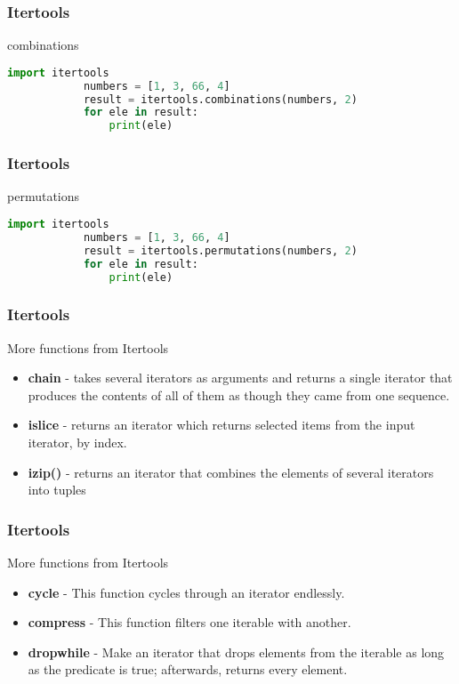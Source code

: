\documentclass[14pt]{beamer}
\begin{document}
    \begin{frame}[containsverbatim]
        \frametitle{Itertools}
        \alert{combinations}
        \begin{lstlisting}[language=Python]
            import itertools
            numbers = [1, 3, 66, 4]
            result = itertools.combinations(numbers, 2)
            for ele in result:
                print(ele)
        \end{lstlisting}
    \end{frame}
    \begin{frame}[containsverbatim]
        \frametitle{Itertools}
        \alert{permutations}
        \begin{lstlisting}[language=Python]
            import itertools
            numbers = [1, 3, 66, 4]
            result = itertools.permutations(numbers, 2)
            for ele in result:
                print(ele)
        \end{lstlisting}
    \end{frame}
    \begin{frame}
        \frametitle{Itertools}
        \alert{More functions from Itertools}
        \begin{itemize}
            \item \textbf{chain} - takes several iterators as arguments and returns a single iterator that produces the contents of all of them as though they came from one sequence.
            \item \textbf{islice} - returns an iterator which returns selected items from the input iterator, by index. 
            \item \textbf{izip()} - returns an iterator that combines the elements of several iterators into tuples
        \end{itemize}
    \end{frame}
    \begin{frame}
        \frametitle{Itertools}
        \alert{More functions from Itertools}
        \begin{itemize}
            \item \textbf{cycle} - This function cycles through an iterator endlessly.
            \item \textbf{compress} - This function filters one iterable with another.
            \item \textbf{dropwhile} - Make an iterator that drops elements from the iterable as long as the predicate is true; afterwards, returns every element.
        \end{itemize}
    \end{frame}
\end{document}

